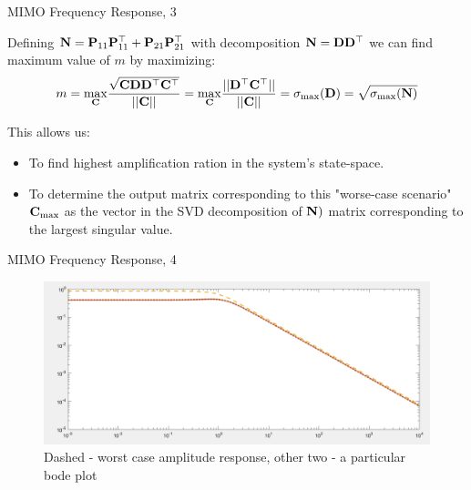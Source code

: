 \documentclass{beamer}
\begin{document}
\begin{frame}{MIMO Frequency Response, 3}
	\begin{flushleft}
		
		Defining $\mathbf{N} = \mathbf{P} _{11} \mathbf{P} _{11}^\top +\mathbf{P} _{21} \mathbf{P} _{21}^\top$ with decomposition $\mathbf{N} = \mathbf{D} \mathbf{D}^\top$ we can find maximum value of $m$ by maximizing:
		\begin{align*}
			m = \underset{\mathbf{C}}{\max } \frac{\sqrt{\mathbf{C} \mathbf{D} \mathbf{D}^\top \mathbf{C}^\top}}{|| \mathbf{C}||}
			=
			\underset{\mathbf{C}}{\max } \frac{||\mathbf{D}^\top \mathbf{C}^\top||}{|| \mathbf{C}||} = \sigma_{\max}(\mathbf{D}) =\sqrt{ \sigma_{\max}(\mathbf{N})}
		\end{align*}		
		
		This allows us:
		
		\begin{itemize}
			\item To find highest amplification ration in the system's state-space.
			
			\item To determine the output matrix corresponding to this "worse-case scenario"  $\mathbf{C}_{\max}$ as the vector in the SVD decomposition of $\mathbf{N})$ matrix corresponding to the largest singular value.
		\end{itemize}
		
	\end{flushleft}
\end{frame}



\begin{frame}{MIMO Frequency Response, 4}
	\begin{flushleft}
		
		\begin{figure}
			\centering
			\includegraphics[width=1 \linewidth]{WorstCaseAmp}
			\caption{Dashed - worst case amplitude response, other two - a particular bode plot}
			\label{fig:worstcaseamp}
		\end{figure}
		
		
	\end{flushleft}
\end{frame}
\end{document}
